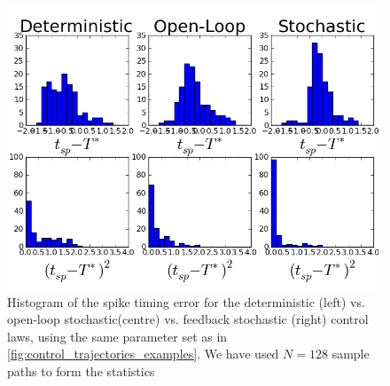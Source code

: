 \documentclass{article}
\begin{document}
\begin{figure}[h]
\begin{center}
  \includegraphics[width=.95\textwidth]
  {Figs/ControlSimulator/3controls_example_trajectories_hists.png}
  \caption[labelInTOC]{Histogram of the spike timing error for the
  deterministic (left) vs. open-loop stochastic(centre) vs. feedback stochastic
  (right) control laws, using the same parameter set as in \cref{fig:control_trajectories_examples}. We have used $N=128$ sample paths
  to form the statistics}
  \label{fig:error_histograms_det_vs_openloop_vs_stoch} 
\end{center}
\end{figure}




\end{document}
